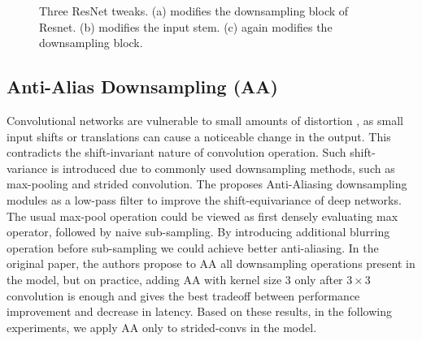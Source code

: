 \begin{figure}[t!]
{  }\hfill%
  \caption{Three ResNet tweaks. (a) modifies the downsampling block of Resnet. (b) modifies the input stem. (c) again modifies the downsampling block.}
  \label{fig:resnet-tweaks}
\end{figure}


\subsection{Anti-Alias Downsampling (AA)}
Convolutional networks are vulnerable to small amounts of distortion \cite{xie2020_adversarial}, as small input shifts or translations can cause a noticeable change in the output. This contradicts the shift-invariant nature of convolution operation. Such shift-variance is introduced due to commonly used downsampling methods, such as max-pooling and strided convolution. The \cite{zhang2019_making_aa_shift_invariant} proposes Anti-Aliasing downsampling modules as a low-pass filter to improve the shift-equivariance of deep networks. The usual max-pool operation could be viewed as first densely evaluating max operator, followed by naive sub-sampling. By introducing additional blurring operation before sub-sampling we could achieve better anti-aliasing. In the original paper, the authors propose to AA all downsampling operations present in the model, but on practice, \cite{lee2020_compounding_improvements} adding AA with kernel size 3 only after $3 \times 3 $ convolution is enough and gives the best tradeoff between performance improvement and decrease in latency. Based on these results, in the following experiments, we apply AA only to strided-convs in the model. 





